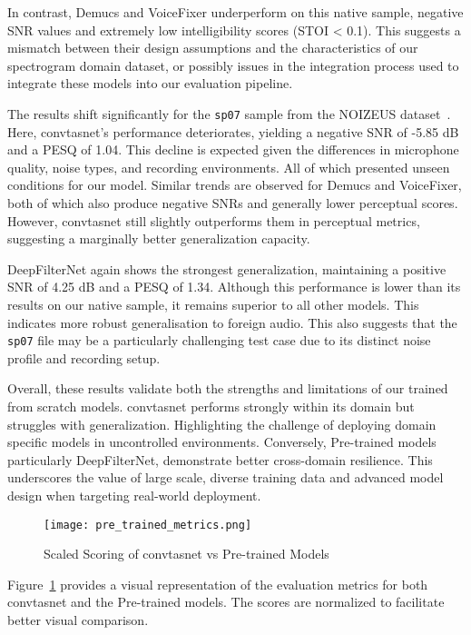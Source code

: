 In contrast, Demucs and VoiceFixer underperform on this native sample, negative SNR values and extremely low intelligibility scores (STOI < 0.1). This suggests a mismatch between their design assumptions and the characteristics of our spectrogram domain dataset, or possibly issues in the integration process used to integrate these models into our evaluation pipeline.

The results shift significantly for the \texttt{sp07} sample from the NOIZEUS dataset~\cite{hu2007subjective}. Here, \gls{convtasnet}'s performance deteriorates, yielding a negative SNR of -5.85 dB and a PESQ of 1.04. This decline is expected given the differences in microphone quality, noise types, and recording environments. All of which presented unseen conditions for our model. Similar trends are observed for Demucs and VoiceFixer, both of which also produce negative SNRs and generally lower perceptual scores. However, \gls{convtasnet} still slightly outperforms them in perceptual metrics, suggesting a marginally better generalization capacity.

DeepFilterNet again shows the strongest generalization, maintaining a positive SNR of 4.25 dB and a PESQ of 1.34. Although this performance is lower than its results on our native sample, it remains superior to all other models. This indicates more robust generalisation to foreign audio. This also suggests that the \texttt{sp07} file may be a particularly challenging test case due to its distinct noise profile and recording setup.

Overall, these results validate both the strengths and limitations of our trained from scratch models. \gls{convtasnet} performs strongly within its domain but struggles with generalization. Highlighting the challenge of deploying domain specific models in uncontrolled environments. Conversely, Pre-trained models particularly DeepFilterNet, demonstrate better cross-domain resilience. This underscores the value of large scale, diverse training data and advanced model design when targeting real-world deployment.

\begin{figure}[H]
\centering
\texttt{[image: pre\_trained\_metrics.png]}
\caption{Scaled Scoring of \gls{convtasnet} vs Pre-trained Models}
\label{fig:pretrained_metrics}
\end{figure}
\noindent

Figure~\ref{fig:pretrained_metrics} provides a visual representation of the evaluation metrics for both \gls{convtasnet} and the Pre-trained models. The scores are normalized to facilitate better visual comparison.

